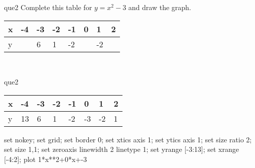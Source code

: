 \documentclass[13.5pt, varwidth=true]{beamer}
\begin{document}
\begin{frame}[shrink=19,fragile]
	\begin{beamercolorbox}[rounded=true, left, shadow=true,wd=14.8cm]{que2}
		 Complete this table for $y = x^{2} - 3$ and draw the graph. \\[0.3cm] \renewcommand{\arraystretch}{1.2}\begin{tabular}{|C|C|C|C|C|C|C|C|} \hline x & -4 & -3 & -2 & -1 & 0 & 1 & 2 \\ \hline y &  & 6 & 1 & -2 &  & -2 & \\ \hline \end{tabular}\\[0.3cm]
	\end{beamercolorbox}
\end{frame}
\begin{frame}[shrink=19,fragile]
	\begin{beamercolorbox}[rounded=true, left, shadow=true,wd=14.8cm]{que2}
		\renewcommand{\arraystretch}{1.2}\begin{tabular}{|C|C|C|C|C|C|C|C|} \hline x & -4 & -3 & -2 & -1 & 0 & 1 & 2 \\ \hline y & 13 & 6 & 1 & -2 & -3 & -2 & 1\\ \hline \end{tabular}\begin{gnuplot}[terminal=pdf] set nokey; set grid; set border 0; set xtics axis 1; set ytics axis 1; set size ratio 2; set size 1,1; set zeroaxis linewidth 2 linetype 1; set yrange [-3:13]; set xrange [-4:2]; plot 1*x**2+0*x+-3 \end{gnuplot}
	\end{beamercolorbox}
\end{frame}
\end{document}
